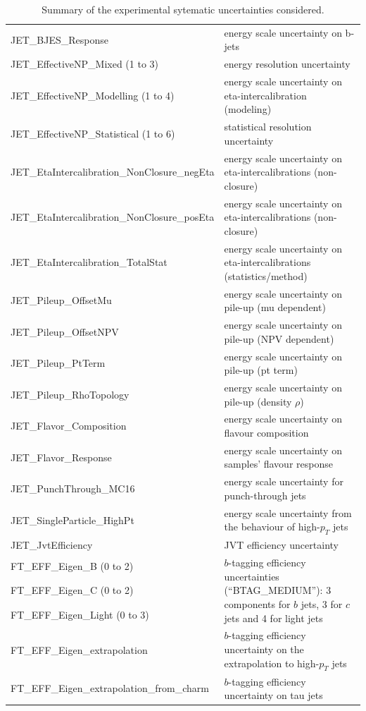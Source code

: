 \begin{table}
{\begin{tabular}{l|l}
  JET\_BJES\_Response & energy scale uncertainty on b-jets \\
  JET\_EffectiveNP\_Mixed (1 to 3) & energy resolution uncertainty \\
  JET\_EffectiveNP\_Modelling (1 to 4) &  energy scale uncertainty on eta-intercalibration (modeling) \\
  JET\_EffectiveNP\_Statistical (1 to 6) &  statistical resolution uncertainty \\
  JET\_EtaIntercalibration\_NonClosure\_negEta &  energy scale uncertainty on eta-intercalibrations (non-closure) \\
  JET\_EtaIntercalibration\_NonClosure\_posEta & energy scale uncertainty on eta-intercalibrations (non-closure) \\
  JET\_EtaIntercalibration\_TotalStat & energy scale uncertainty on eta-intercalibrations (statistics/method) \\
  JET\_Pileup\_OffsetMu                & energy scale uncertainty on pile-up (mu dependent)    \\
  JET\_Pileup\_OffsetNPV               & energy scale uncertainty on pile-up (NPV dependent)   \\
  JET\_Pileup\_PtTerm                  & energy scale uncertainty on pile-up (pt term)         \\
  JET\_Pileup\_RhoTopology             & energy scale uncertainty on pile-up (density $\rho$)  \\
  JET\_Flavor\_Composition             & energy scale uncertainty on flavour composition       \\
  JET\_Flavor\_Response                & energy scale uncertainty on samples' flavour response \\
  JET\_PunchThrough\_MC16              & energy scale uncertainty for punch-through jets       \\
  JET\_SingleParticle\_HighPt          & energy scale uncertainty from the behaviour of high-$p_T$ jets \\
  JET\_JvtEfficiency & JVT efficiency uncertainty      \\
  FT\_EFF\_Eigen\_B (0 to 2) & \multirow{3}{*}{\parbox{11cm}{$b$-tagging efficiency uncertainties (``BTAG\_MEDIUM''): 3 components for $b$ jets, 3 for $c$ jets and 4 for light jets}} \\
  FT\_EFF\_Eigen\_C (0 to 2)                 & \\
  FT\_EFF\_Eigen\_Light (0 to 3)             & \\
  FT\_EFF\_Eigen\_extrapolation              & $b$-tagging efficiency uncertainty on the extrapolation to high-$p_T$ jets\\
  FT\_EFF\_Eigen\_extrapolation\_from\_charm & $b$-tagging efficiency uncertainty on tau jets \\
\hline\hline     
\end{tabular}
}
\caption{Summary of the experimental sytematic uncertainties considered.}
\label{tab:expSyst}
\end{table}


